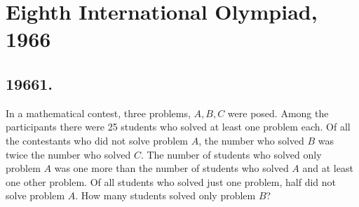 \documentclass{article}
\begin{document}
\section*{Eighth International Olympiad, 1966}

\subsection*{19661.}
In a mathematical contest, three problems, $A, B, C$ were posed. Among the participants there were 25 students who solved at least one problem each. Of all the contestants who did not solve problem $A$, the number who solved $B$ was twice the number who solved $C$. The number of students who solved only problem $A$ was one more than the number of students who solved $A$ and at least one other problem. Of all students who solved just one problem, half did not solve problem $A$. How many students solved only problem $B$?
\end{document}
